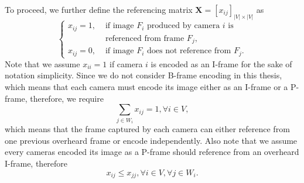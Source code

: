 To proceed, we further 
define the referencing matrix ${\mathbf{X} = [x_{ij}]_{|V| \times |V|}}$ as
\begin{equation*}
\left\{ \begin{array}{ll}
x_{ij} = 1, &\text{ if image $F_i$ produced by camera $i$ is} \\
                   &\text{ referenced from frame $F_j$,} \\
x_{ij} = 0, &\text{ if image $F_i$ does not reference from $F_j$.}
\end{array} \right.
\end{equation*}
Note that we assume $x_{ii}=1$ if camera $i$ is encoded as an I-frame for the sake of notation simplicity.
Since we do not consider B-frame encoding in this thesis, which means that each camera must encode its image either as an I-frame or a P-frame, therefore, we require
\begin{equation}
\sum_{j \in W_i} x_{ij} = 1, \forall i \in V,
\label{eq::referenceConstraint}
\end{equation}
which means that the frame captured by each camera can either reference from one previous overheard frame or encode independently.
Also note that we assume every cameras encoded its image as a P-frame should reference from an overheard I-frame, therefore
\begin{equation}
x_{ij} \leq x_{jj}, \forall i \in V, \forall j \in W_i.
\label{eq::referenceOnlyIframe}
\end{equation}
%
%
